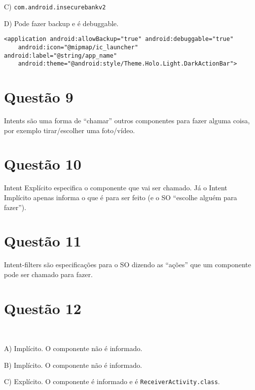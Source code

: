 \documentclass{article}
\begin{document}
C)
\verb|com.android.insecurebankv2|

D)
Pode fazer backup e é debuggable.
\begin{verbatim}
<application android:allowBackup="true" android:debuggable="true"
    android:icon="@mipmap/ic_launcher" android:label="@string/app_name"
    android:theme="@android:style/Theme.Holo.Light.DarkActionBar">
\end{verbatim}

\section*{Questão 9}

Intents são uma forma de ``chamar'' outros componentes
para fazer alguma coisa, por exemplo tirar/escolher uma foto/vídeo.

\section*{Questão 10}

Intent Explícito especifica o componente que vai ser chamado.
Já o Intent Implícito apenas informa o que é para ser feito
(e o SO ``escolhe alguém para fazer'').

\section*{Questão 11}

Intent-filters são especificações para o SO
dizendo as ``ações'' que um componente pode ser chamado
para fazer.

\section*{Questão 12}
\ 

A)
Implícito. O componente não é informado.

B)
Implícito. O componente não é informado.

C)
Explícito. O componente é informado e é \texttt{ReceiverActivity.class}.
\end{document}
